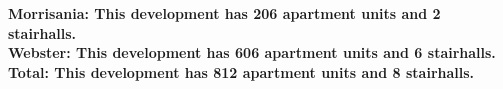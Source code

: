 \bf{Morrisania}: This development has 206 apartment units and 2 stairhalls.\\\bf{Webster}: This development has 606 apartment units and 6 stairhalls.\\\bf{Total}: This development has 812 apartment units and 8 stairhalls.\\